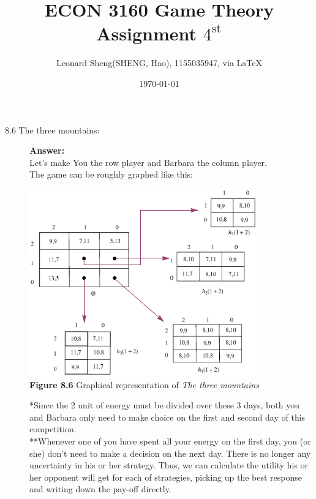 \documentclass{article}
\begin{document}
\title{ECON 3160 Game Theory \\Assignment $4^{\text{st}}$}
\author{{\normalsize Leonard Sheng(SHENG, Hao), 1155035947, via \LaTeX}}
\date{\today}

\maketitle

\def \Pr{{\rm Pr}}

\baselineskip 0.6cm
\begin{description}
    \item[8.6 The three mountains:]{\bf Answer:}\\
    Let's make You the row player and Barbara the column player.\\
    The game can be roughly graphed like this:
    \begin{center}
                    \includegraphics[angle=0, width=0.8\textwidth]{ECON3160A4P1}\\
                    {\bf Figure 8.6} Graphical representation of {\it The three mountains}
    \end{center}
    *Since the 2 unit of energy must be divided over these 3 days, both you and Barbara only need to make choice on the first and second day of this competition.\\
    **Whenever one of you have spent all your energy on the first day, you (or she) don't need to make a decision on the next day. There is no longer any uncertainty in his or her strategy. Thus, we can calculate the utility his or her opponent will get for each of strategies, picking up the best response and writing down the pay-off directly.


\end{description}
\end{document}

